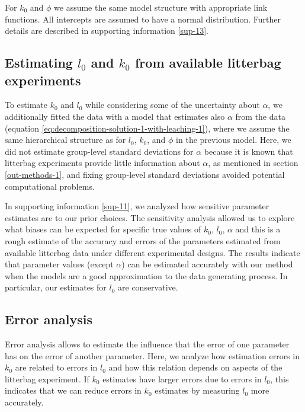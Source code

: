 \documentclass[bg, manuscript]{copernicus}
\begin{document}
For \(k_0\) and \(\phi\) we assume the same model structure with appropriate link functions. All intercepts are assumed to have a normal distribution. Further details are described in supporting information \ref{sup-13}.

\hypertarget{methods-estimate-real-1}{%
\subsection{\texorpdfstring{Estimating \(l_0\) and \(k_0\) from available litterbag experiments}{Estimating l\_0 and k\_0 from available litterbag experiments}}\label{methods-estimate-real-1}}

To estimate \(k_0\) and \(l_0\) while considering some of the uncertainty about \(\alpha\), we additionally fitted the data with a model that estimates also \(\alpha\) from the data (equation \eqref{eq:decomposition-solution-1-with-leaching-1}), where we assume the same hierarchical structure as for \(l_0\), \(k_0\), and \(\phi\) in the previous model. Here, we did not estimate group-level standard deviations for \(\alpha\) because it is known that litterbag experiments provide little information about \(\alpha\), as mentioned in section \ref{out-methods-1}, and fixing group-level standard deviations avoided potential computational problems.

In supporting information \ref{sup-11}, we analyzed how sensitive parameter estimates are to our prior choices. The sensitivity analysis allowed us to explore what biases can be expected for specific true values of \(k_0\), \(l_0\), \(\alpha\) and this is a rough estimate of the accuracy and errors of the parameters estimated from available litterbag data under different experimental designs. The results indicate that parameter values (except \(\alpha\)) can be estimated accurately with our method when the models are a good approximation to the data generating process. In particular, our estimates for \(l_0\) are conservative.

\subsection{Error analysis}

Error analysis allows to estimate the influence that the error of one parameter has on the error of another parameter. Here, we analyze how estimation errors in \(k_0\) are related to errors in \(l_0\) and how this relation depends on aspects of the litterbag experiment. If \(k_0\) estimates have larger errors due to errors in \(l_0\), this indicates that we can reduce errors in \(k_0\) estimates by measuring \(l_0\) more accurately.
\end{document}
